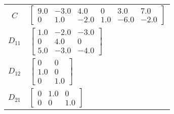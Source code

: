 \begin{tabular}{cl}
   $C$    & $\left[\begin{matrix}9.0 & -3.0 & 4.0 & 0 & 3.0 & 7.0\\0 & 1.0 & -2.0 & 1.0 & -6.0 & -2.0\end{matrix}\right]$                                                                                                                                                   \\
 $D_{11}$ & $\left[\begin{matrix}1.0 & -2.0 & -3.0\\0 & 4.0 & 0\\5.0 & -3.0 & -4.0\end{matrix}\right]$                                                                                                                                                                      \\
 $D_{12}$ & $\left[\begin{matrix}0 & 0\\1.0 & 0\\0 & 1.0\end{matrix}\right]$                                                                                                                                                                                                \\
 $D_{21}$ & $\left[\begin{matrix}0 & 1.0 & 0\\0 & 0 & 1.0\end{matrix}\right]$                                                                                                                                                                                               \\
\hline
\end{tabular}